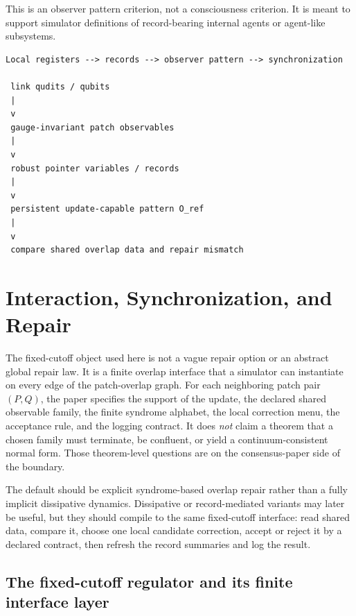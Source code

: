\documentclass[11pt]{article}
\begin{document}
This is an observer pattern criterion, not a consciousness criterion. It is meant to support
simulator definitions of record-bearing internal agents or agent-like subsystems.

\begin{verbatim}
Local registers --> records --> observer pattern --> synchronization

 link qudits / qubits
 |
 v
 gauge-invariant patch observables
 |
 v
 robust pointer variables / records
 |
 v
 persistent update-capable pattern O_ref
 |
 v
 compare shared overlap data and repair mismatch
\end{verbatim}

\section{Interaction, Synchronization, and Repair}

The fixed-cutoff object used here is not a vague repair option or an abstract global repair law. It is a finite overlap interface that a simulator can instantiate
on every edge of the patch-overlap graph. For each neighboring patch
pair $(P,Q)$, the paper specifies the support of the update, the declared shared
observable family, the finite syndrome alphabet, the local correction menu, the acceptance rule,
and the logging contract. It does \emph{not} claim a theorem that a chosen family
must terminate, be confluent, or yield a continuum-consistent normal form. Those theorem-level
questions are on the consensus-paper side of the boundary.

The default should be explicit syndrome-based overlap repair rather than a fully
implicit dissipative dynamics. Dissipative or record-mediated variants may later be useful, but
they should compile to the same fixed-cutoff interface: read shared data, compare it, choose one
local candidate correction, accept or reject it by a declared contract, then refresh the record
summaries and log the result.

\subsection{The fixed-cutoff regulator and its finite interface layer}
\end{document}
